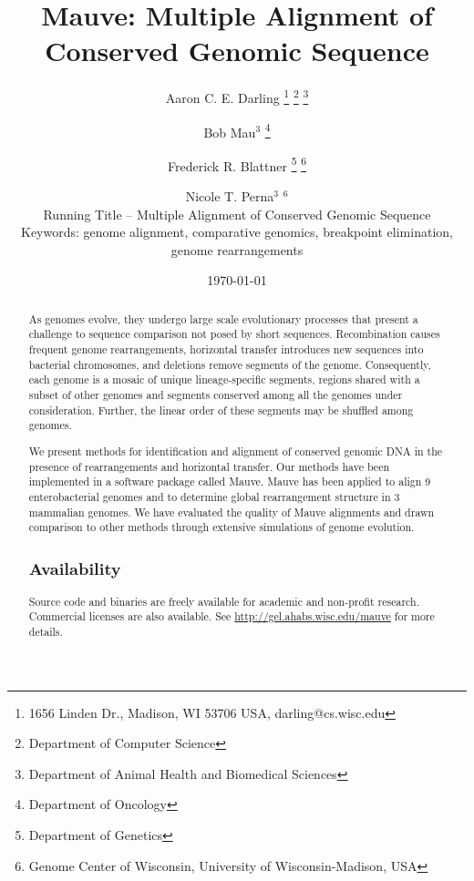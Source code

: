 \documentclass[titlepage,11pt]{article}
\begin{document}
\selectfont

\title{Mauve: Multiple Alignment of Conserved Genomic Sequence}

\author{
Aaron C. E. Darling
\footnote{1656 Linden Dr., Madison, WI 53706 USA, darling@cs.wisc.edu}
\thanks{Department of Computer Science}
\thanks{Department of Animal Health and Biomedical Sciences}
\and
Bob Mau$^3$
\thanks{Department of Oncology}
\and
Frederick R. Blattner
\thanks{Department of Genetics}
\thanks{Genome Center of Wisconsin, University of Wisconsin-Madison, USA}
\and
Nicole T. Perna$^3$ $^6$\\
Running Title -- Multiple Alignment of Conserved Genomic Sequence\\
Keywords:  genome alignment, comparative genomics, breakpoint elimination,\\
genome rearrangements
}
\date{ \today }


\maketitle


\begin{abstract}
As genomes evolve, they undergo large scale evolutionary processes that present
a challenge to sequence comparison not posed by short sequences. Recombination
causes frequent genome rearrangements,
horizontal transfer introduces new sequences into bacterial chromosomes, and
deletions remove segments of the genome. Consequently, each genome is a mosaic
of unique lineage-specific segments, regions shared with a subset of other
genomes and segments conserved among all the genomes under consideration.
Further, the linear order of these segments may be shuffled among genomes.

We present methods for identification and alignment of conserved genomic DNA in the
presence of rearrangements and horizontal transfer. Our methods have been
implemented in a software package called Mauve.  Mauve has been applied to align
9 enterobacterial genomes and to determine global rearrangement structure in 3
mammalian genomes.  We have evaluated the quality of Mauve alignments and drawn
comparison to other methods through extensive simulations of genome evolution.

\subsection*{Availability}
Source code and binaries are freely available for academic and non-profit
research. Commercial licenses are also available.  See
\url{http://gel.ahabs.wisc.edu/mauve} for more details.
\end{abstract}
\end{document}
